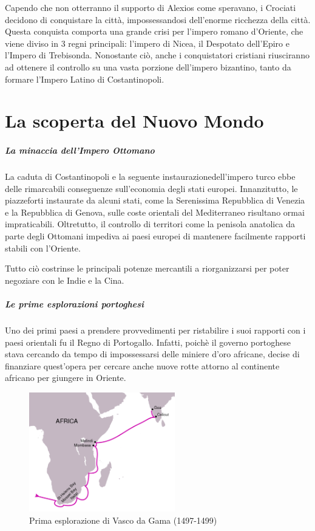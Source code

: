 \documentclass[11pt]{report}
\begin{document}
	Capendo che non otterranno il supporto di Alexios come speravano, i Crociati decidono di conquistare la città, impossessandosi dell'enorme ricchezza della città. Questa conquista comporta una grande crisi per l'impero romano d'Oriente, che viene diviso in 3 regni principali: l'impero di Nicea, il Despotato dell'Epiro e l'Impero di Trebisonda. Nonostante ciò, anche i conquistatori cristiani riusciranno ad ottenere il controllo su una vasta porzione dell'impero bizantino, tanto da formare l'Impero Latino di Costantinopoli.
	
	\chapter{La scoperta del Nuovo Mondo}
	
	\paragraph*{La minaccia dell'Impero Ottomano}
	
	La caduta di Costantinopoli e la seguente instaurazionedell'impero turco ebbe delle rimarcabili conseguenze sull'economia degli stati europei. Innanzitutto, le piazzeforti instaurate da alcuni stati, come la Serenissima Repubblica di Venezia e la Repubblica di Genova, sulle coste orientali del Mediterraneo risultano ormai impraticabili. Oltretutto, il controllo di territori come la penisola anatolica da parte degli Ottomani impediva ai paesi europei di mantenere facilmente rapporti stabili con l'Oriente.
	
	Tutto ciò costrinse le principali potenze mercantili a riorganizzarsi per poter negoziare con le Indie e la Cina. 
	
	\paragraph*{Le prime esplorazioni portoghesi}
	
	Uno dei primi paesi a prendere provvedimenti per ristabilire i suoi rapporti con i paesi orientali fu il Regno di Portogallo. Infatti, poichè il governo portoghese stava cercando da tempo di impossessarsi delle miniere d'oro africane, decise di finanziare quest'opera per cercare anche nuove rotte attorno al continente africano per giungere in Oriente.
	
	\begin{figure}
		\includegraphics[width=2.5in]{"vasco da gama"}
		\caption{{\small Prima esplorazione di Vasco da Gama (1497-1499)}}
	\end{figure} 
	
\end{document}
